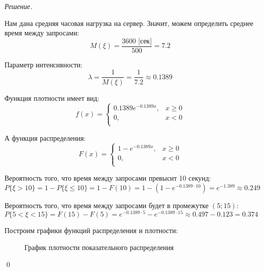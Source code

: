 \documentclass[12pt,a4paper]{article}
\theoremstyle{definition}
\theoremstyle{definition}
\theoremstyle{remark}
\theoremstyle{corollary}
\theoremstyle{bolditalic}
\newenvironment{solution}{
    \vspace{0.5em}
    \noindent\textit{Решение.}
}{\qed\vspace{1em}}
\begin{document}
\begin{solution}

Нам дана средняя часовая нагрузка на сервер. Значит, можем определить среднее время между запросами:
\[
M(\xi) = \frac{3600 \text{ [сек]}}{500} = 7.2
\]

Параметр интенсивности:
\[
\lambda = \frac{1}{M(\xi)} = \frac{1}{7.2} \approx 0.1389
\]

Функция плотности имеет вид:
\[
f(x)=\begin{cases}
      0.1389 e^{-0.1389 x}, & x \geq 0 \\
      0, & x < 0 \\
    \end{cases}
\]

А функция распределения:
\[
F(x) = \begin{cases}
      1 - e^{-0.1389 x}, & x \geq 0 \\
      0, & x < 0 \\
    \end{cases}
\]

Вероятность того, что время между запросами превысит 10 секунд:
    \[
    P\{\xi > 10\} = 1 - P\{\xi \le 10\} = 1 - F(10) = 1 - (1 - e^{-0.1389 \cdot 10}) = e^{-1.389} \approx 0.249
    \]
    
   Вероятность того, что время между запросами будет в промежутке $(5;15)$:
    \[
    P \{5 < \xi < 15\} = F(15) - F(5) = e^{-0.1389 \cdot 5} - e^{-0.1389 \cdot 15} \approx 0.497 - 0.123 = 0.374
    \]

Построим графики функций распределения и плотности:

\begin{figure}[h!]
\centering
{}
\caption{График плотности показательного распределения}
\end{figure}


\end{solution}
\end{document}
